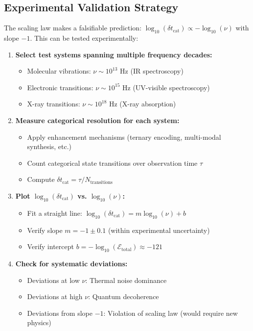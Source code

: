 \documentclass[twocolumn,10pt]{article}
\theoremstyle{remark}
\begin{document}
\subsection{Experimental Validation Strategy}

The scaling law makes a falsifiable prediction: $\log_{10}(\delta t_{\text{cat}}) \propto -\log_{10}(\nu)$ with slope $-1$. This can be tested experimentally:

\begin{enumerate}
    \item \textbf{Select test systems spanning multiple frequency decades:}
    \begin{itemize}
        \item Molecular vibrations: $\nu \sim 10^{13}$ Hz (IR spectroscopy)
        \item Electronic transitions: $\nu \sim 10^{15}$ Hz (UV-visible spectroscopy)
        \item X-ray transitions: $\nu \sim 10^{18}$ Hz (X-ray absorption)
    \end{itemize}

    \item \textbf{Measure categorical resolution for each system:}
    \begin{itemize}
        \item Apply enhancement mechanisms (ternary encoding, multi-modal synthesis, etc.)
        \item Count categorical state transitions over observation time $\tau$
        \item Compute $\delta t_{\text{cat}} = \tau / N_{\text{transitions}}$
    \end{itemize}

    \item \textbf{Plot $\log_{10}(\delta t_{\text{cat}})$ vs. $\log_{10}(\nu)$:}
    \begin{itemize}
        \item Fit a straight line: $\log_{10}(\delta t_{\text{cat}}) = m \log_{10}(\nu) + b$
        \item Verify slope $m = -1 \pm 0.1$ (within experimental uncertainty)
        \item Verify intercept $b = -\log_{10}(\mathcal{E}_{\text{total}}) \approx -121$
    \end{itemize}

    \item \textbf{Check for systematic deviations:}
    \begin{itemize}
        \item Deviations at low $\nu$: Thermal noise dominance
        \item Deviations at high $\nu$: Quantum decoherence
        \item Deviations from slope $-1$: Violation of scaling law (would require new physics)
    \end{itemize}
\end{enumerate}
\end{document}
